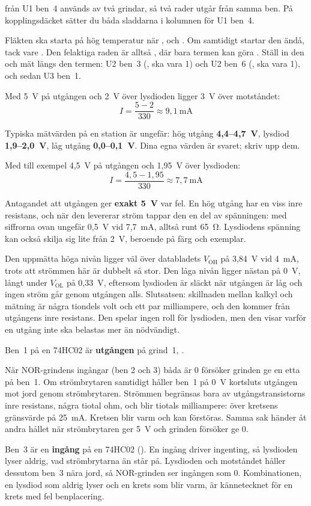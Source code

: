 \noindent{} från U1 ben~4 används av två grindar, så två rader utgår från samma ben. På
kopplingsdäcket sätter du båda sladdarna i kolumnen för U1 ben~4.

Fläkten ska starta på hög temperatur när ,  och . Om
 samtidigt startar den ändå, tack vare . Den felaktiga raden är alltså
\textbf{}, där bara termen  kan göra . Ställ in den och
mät längs den termen: U2 ben~3 (, ska vara 1) och U2 ben~6 (, ska vara 1),
och sedan U3 ben~1.

Med 5~V på utgången och 2~V över lysdioden ligger 3~V över motståndet:
\[
  I = \frac{5 - 2}{330} \approx 9,1\ \text{mA}
\]

Typiska mätvärden på en station är ungefär: hög utgång \textbf{4,4--4,7~V}, lysdiod
\textbf{1,9--2,0~V}, låg utgång \textbf{0,0--0,1~V}. Dina egna värden är svaret; skriv upp dem.

Med till exempel 4,5~V på utgången och 1,95~V över lysdioden:
\[
  I = \frac{4,5 - 1,95}{330} \approx 7,7\ \text{mA}
\]

Antagandet att utgången ger \textbf{exakt 5~V} var fel. En hög utgång har en viss inre
resistans, och när den levererar ström tappar den en del av spänningen: med siffrorna ovan ungefär
0,5~V vid 7,7~mA, alltså runt 65~Ω. Lysdiodens spänning kan också skilja sig lite från 2~V,
beroende på färg och exemplar.

Den uppmätta höga nivån ligger väl över databladets $V_{\text{OH}}$ på 3,84~V vid 4~mA, trots att
strömmen här är dubbelt så stor. Den låga nivån ligger nästan på 0~V, långt under $V_{\text{OL}}$
på 0,33~V, eftersom lysdioden är släckt när utgången är låg och ingen ström går genom utgången
alls. Slutsatsen: skillnaden mellan kalkyl och mätning är några tiondels volt och ett par
milliampere, och den kommer från utgångens inre resistans. Den spelar ingen roll för lysdioden, men
den visar varför en utgång inte ska belastas mer än nödvändigt.

Ben~1 på en 74HC02 är \textbf{utgången} på grind~1, .

När NOR-grindens ingångar (ben 2 och 3) båda är 0 försöker grinden ge en etta på ben~1. Om
strömbrytaren samtidigt håller ben~1 på 0~V kortsluts utgången mot jord genom strömbrytaren.
Strömmen begränsas bara av utgångstransistorns inre resistans, några tiotal ohm, och blir tiotals
milliampere: över kretsens gränsvärde på 25~mA. Kretsen blir varm och kan förstöras. Samma sak
händer åt andra hållet när strömbrytaren ger 5~V och grinden försöker ge 0.

Ben~3 är en \textbf{ingång} på en 74HC02 (). En ingång driver ingenting, så
lysdioden lyser aldrig, vad strömbrytarna än står på. Lysdioden och motståndet håller dessutom
ben~3 nära jord, så NOR-grinden ser ingången som 0. Kombinationen, en lysdiod som aldrig lyser och
en krets som blir varm, är kännetecknet för en krets med fel benplacering.

